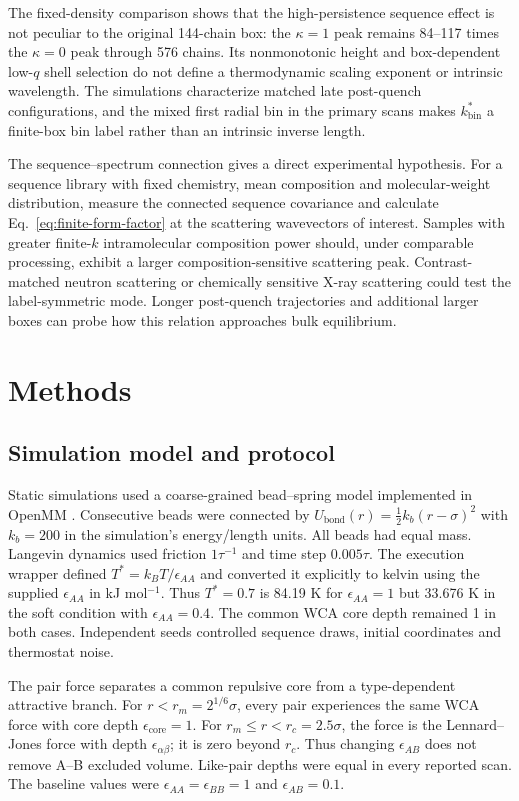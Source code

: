 \documentclass[pdflatex,sn-nature,onecolumn]{sn-jnl}
\begin{document}
The fixed-density comparison shows that the high-persistence sequence effect is not peculiar to the original 144-chain box: the $\kappa=1$ peak remains 84--117 times the $\kappa=0$ peak through 576 chains. Its nonmonotonic height and box-dependent low-$q$ shell selection do not define a thermodynamic scaling exponent or intrinsic wavelength. The simulations characterize matched late post-quench configurations, and the mixed first radial bin in the primary scans makes $k_{\mathrm{bin}}^*$ a finite-box bin label rather than an intrinsic inverse length.

The sequence--spectrum connection gives a direct experimental hypothesis. For a sequence library with fixed chemistry, mean composition and molecular-weight distribution, measure the connected sequence covariance and calculate Eq.~\ref{eq:finite-form-factor} at the scattering wavevectors of interest. Samples with greater finite-$k$ intramolecular composition power should, under comparable processing, exhibit a larger composition-sensitive scattering peak. Contrast-matched neutron scattering or chemically sensitive X-ray scattering could test the label-symmetric mode. Longer post-quench trajectories and additional larger boxes can probe how this relation approaches bulk equilibrium.

\section{Methods}

\subsection{Simulation model and protocol}

Static simulations used a coarse-grained bead--spring model implemented in OpenMM \cite{Eastman2017}. Consecutive beads were connected by $U_{\mathrm{bond}}(r)=\tfrac12k_b(r-\sigma)^2$ with $k_b=200$ in the simulation's energy/length units. All beads had equal mass. Langevin dynamics used friction $1\tau^{-1}$ and time step $0.005\tau$. The execution wrapper defined $T^*=k_BT/\epsilon_{AA}$ and converted it explicitly to kelvin using the supplied $\epsilon_{AA}$ in kJ mol$^{-1}$. Thus $T^*=0.7$ is 84.19 K for $\epsilon_{AA}=1$ but 33.676 K in the soft condition with $\epsilon_{AA}=0.4$. The common WCA core depth remained 1 in both cases. Independent seeds controlled sequence draws, initial coordinates and thermostat noise.

The pair force separates a common repulsive core from a type-dependent attractive branch. For $r<r_m=2^{1/6}\sigma$, every pair experiences the same WCA force with core depth $\epsilon_{\mathrm{core}}=1$. For $r_m\le r<r_c=2.5\sigma$, the force is the Lennard--Jones force with depth $\epsilon_{\alpha\beta}$; it is zero beyond $r_c$. Thus changing $\epsilon_{AB}$ does not remove A--B excluded volume. Like-pair depths were equal in every reported scan. The baseline values were $\epsilon_{AA}=\epsilon_{BB}=1$ and $\epsilon_{AB}=0.1$.
\end{document}
